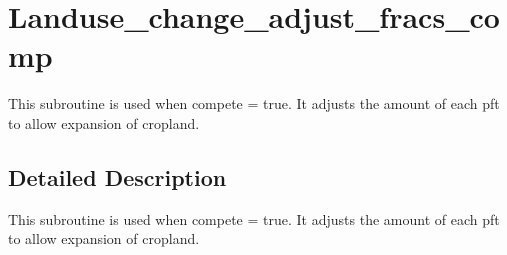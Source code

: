 \hypertarget{group__landuse__change__adjust__fracs__comp}{}\section{Landuse\+\_\+change\+\_\+adjust\+\_\+fracs\+\_\+comp}
\label{group__landuse__change__adjust__fracs__comp}


This subroutine is used when compete = true. It adjusts the amount of each pft to allow expansion of cropland.  




\subsection{Detailed Description}
This subroutine is used when compete = true. It adjusts the amount of each pft to allow expansion of cropland. 

